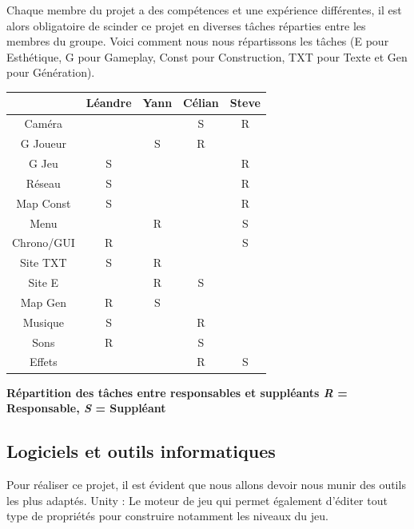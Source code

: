 \documentclass{article}
\begin{document}
Chaque membre du projet a des compétences et une expérience différentes, il est alors obligatoire de scinder ce projet en diverses tâches réparties entre les membres du groupe. Voici comment nous nous répartissons les tâches (E pour Esthétique, G pour Gameplay, Const pour Construction, TXT pour Texte et Gen pour Génération).


\begin{center}
\begin{tabular}{|c|c|c|c|c|}
	\hline
	& Léandre & Yann & Célian & Steve \\
	\hline
	Caméra & & & S & R \\
	\hline
	G Joueur & & S & R & \\
	\hline
	G Jeu & S & & & R \\
	\hline
	Réseau & S & & & R \\
	\hline
	Map Const & S & & & R \\
	\hline
	Menu & & R & & S \\
	\hline
	Chrono/GUI & R & & & S \\
	\hline
	Site TXT & S & R & & \\
	\hline
	Site E & & R & S & \\
	\hline
	Map Gen & R & S & & \\
	\hline
	Musique & S & & R & \\
	\hline
	Sons & R & & S & \\
	\hline
	Effets & & & R & S \\
	\hline	
\end{tabular}
\end{center}

\begin{center}
	\bf{Répartition des tâches entre responsables et suppléants}
	\newline
	\bf{\emph{R} = Responsable, \emph{S} = Suppléant}
\end{center}

\subsection{Logiciels et outils informatiques}
Pour réaliser ce projet, il est évident que nous allons devoir nous munir des outils les plus adaptés.
Unity : Le moteur de jeu qui permet également d'éditer tout type de propriétés pour construire notamment les niveaux du jeu.
\end{document}

